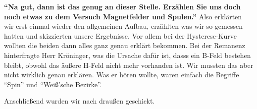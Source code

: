 \noindent \textbf{\enquote{Na gut, dann ist das genug an dieser Stelle. Erzählen Sie uns doch noch etwas zu dem Versuch Magnetfelder und Spulen.}} 
Also erklärten wir erst einmal wieder den allgemeinen Aufbau, erzählten was wir so gemessen hatten und skizzierten unsere Ergebnisse. 
Vor allem bei der Hysterese-Kurve wollten die beiden dann alles ganz genau erklärt bekommen. Bei der Remanenz hinterfragte Herr Kröninger, 
was die Ursache dafür ist, dasss ein B-Feld bestehen bleibt, obwohl das äußere H-Feld nicht mehr vorhanden ist. Wir mussten das aber nicht wirklich 
genau erklären. Was er hören wollte, waren einfach die Begriffe \enquote{Spin} und \enquote{Weiß'sche Bezirke}.

\noindent Anschließend wurden wir nach draußen geschickt.


